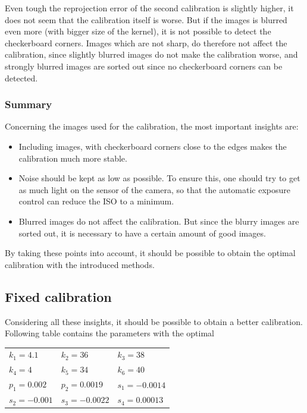 Even tough the reprojection error of the second calibration is slightly higher, it does not seem that the calibration itself is worse.
But if the images is blurred even more (with bigger size of the kernel), it is not possible to detect the checkerboard corners.
Images which are not sharp, do therefore not affect the calibration, since slightly blurred images do not make the calibration worse, and strongly blurred images are sorted out since no checkerboard corners can be detected.

\subsubsection{Summary}
Concerning the images used for the calibration, the most important insights are:
\begin{itemize}
\item Including images, with checkerboard corners close to the edges makes the calibration much more stable.
\item Noise should be kept as low as possible. To ensure this, one should try to get as much light on the sensor of the camera, so that the automatic exposure control can reduce the ISO to a minimum.
\item Blurred images do not affect the calibration. But since the blurry images are sorted out, it is necessary to have a certain amount of good images.
\end{itemize}
By taking these points into account, it should be possible to obtain the optimal calibration with the introduced methods.


\subsection{Fixed calibration}
Considering all these insights, it should be possible to obtain a better calibration.
Following table contains the parameters with the optimal


\begin{center}
	\begin{tabular}{lll}
		$k_1 = 4.1$   &$k_2 = 36$     &$k_3 = 38$\\
		$k_4 = 4$     &$k_5 = 34$     &$k_6 = 40$\\
		$p_1 = 0.002$ &$p_2 = 0.0019$ &$s_1 = -0.0014$\\
		$s_2 = -0.001$&$s_3 = -0.0022$&$s_4 = 0.00013$	
	\end{tabular} 
\end{center}

